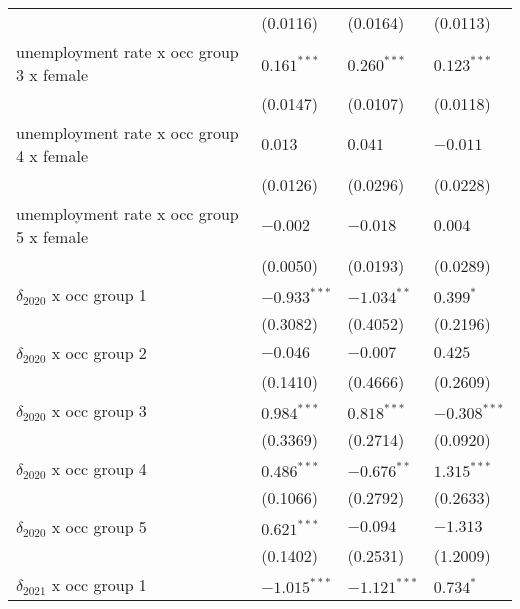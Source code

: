 \begin{tabular}{llll}
                                         &           (0.0116) &           (0.0164) &           (0.0113) \\
unemployment rate x occ group 3 x female &      $0.161^{***}$ &      $0.260^{***}$ &      $0.123^{***}$ \\
                                         &           (0.0147) &           (0.0107) &           (0.0118) \\
unemployment rate x occ group 4 x female &            $0.013$ &            $0.041$ &           $-0.011$ \\
                                         &           (0.0126) &           (0.0296) &           (0.0228) \\
unemployment rate x occ group 5 x female &           $-0.002$ &           $-0.018$ &            $0.004$ \\
                                         &           (0.0050) &           (0.0193) &           (0.0289) \\
$\delta_{2020}$ x occ group 1            &     $-0.933^{***}$ &      $-1.034^{**}$ &          $0.399^*$ \\
                                         &           (0.3082) &           (0.4052) &           (0.2196) \\
$\delta_{2020}$ x occ group 2            &           $-0.046$ &           $-0.007$ &            $0.425$ \\
                                         &           (0.1410) &           (0.4666) &           (0.2609) \\
$\delta_{2020}$ x occ group 3            &      $0.984^{***}$ &      $0.818^{***}$ &     $-0.308^{***}$ \\
                                         &           (0.3369) &           (0.2714) &           (0.0920) \\
$\delta_{2020}$ x occ group 4            &      $0.486^{***}$ &      $-0.676^{**}$ &      $1.315^{***}$ \\
                                         &           (0.1066) &           (0.2792) &           (0.2633) \\
$\delta_{2020}$ x occ group 5            &      $0.621^{***}$ &           $-0.094$ &           $-1.313$ \\
                                         &           (0.1402) &           (0.2531) &           (1.2009) \\
$\delta_{2021}$ x occ group 1            &     $-1.015^{***}$ &     $-1.121^{***}$ &          $0.734^*$ \\

\end{tabular}
